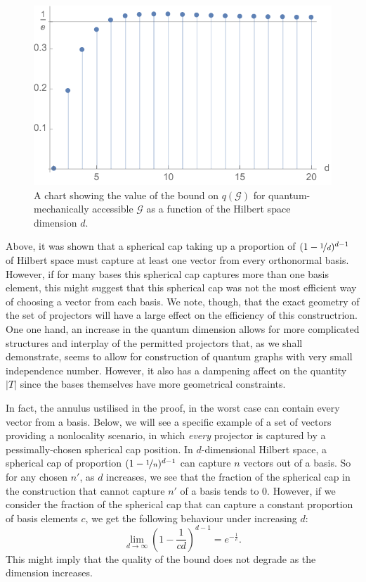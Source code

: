 \documentclass{amsart}
\theoremstyle{definition}
\begin{document}
\begin{figure}
\begin{center}
\includegraphics{boundgraph}
\caption{A chart showing the value of the bound on $q(\mathcal{G})$ for quantum-mechanically accessible $\mathcal{G}$ as a function of the Hilbert space dimension $d$.}
\label{boundgraph}
\end{center}
\end{figure}
Above, it was shown that a spherical cap taking up a proportion of $(1-\nicefrac1d)^{d-1}$ of Hilbert space must capture at least one vector from every orthonormal basis. However, if for many bases this spherical cap captures more than one basis element, this might suggest that this spherical cap was not the most efficient way of choosing a vector from each basis. We note, though, that the exact geometry of the set of projectors will have a large effect on the efficiency of this constructrion. One one hand, an increase in the quantum dimension allows for more complicated structures and interplay of the permitted projectors that, as we shall demonstrate, seems to allow for construction of quantum graphs with very small independence number. However, it also has a dampening affect on the quantity $|T|$ since the bases themselves have more geometrical constraints. %

In fact, the annulus ustilised in the proof, in the worst case can contain every vector from a basis. Below, we will see a specific example of a set of vectors providing a nonlocality scenario, in which \emph{every} projector is captured by a pessimally-chosen spherical cap position. In $d$-dimensional Hilbert space, a spherical cap of proportion $(1-\nicefrac1n)^{d-1}$ can capture $n$ vectors out of a basis. So for any chosen $n'$, as $d$ increases, we see that the fraction of the spherical cap in the construction that cannot capture $n'$ of a basis tends to 0. However, if we consider the fraction of the spherical cap that can capture a constant proportion of basis elements $c$, we get the following behaviour under increasing $d$:
\begin{equation}
\lim_{d\rightarrow\infty} \left(1-\frac{1}{cd}\right)^{d-1}=e^{-\frac1c}.
\end{equation}
This might imply that the quality of the bound does not degrade as the dimension increases.%
\end{document}
